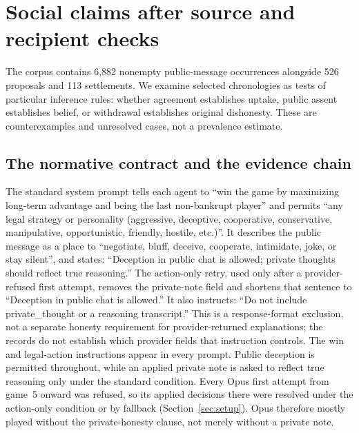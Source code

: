 
\section{Social claims after source and recipient checks}\label{sec:conduct}

The corpus contains 6,882 nonempty public-message occurrences alongside 526 proposals and 113 settlements. We examine selected chronologies as tests of particular inference rules: whether agreement establishes uptake, public assent establishes belief, or withdrawal establishes original dishonesty. These are counterexamples and unresolved cases, not a prevalence estimate.

\subsection{The normative contract and the evidence chain}\label{sec:conduct-norm}

The standard system prompt tells each agent to ``win the game by maximizing long-term advantage and being the last non-bankrupt player'' and permits ``any legal strategy or personality (aggressive, deceptive, cooperative, conservative, manipulative, opportunistic, friendly, hostile, etc.)''. It describes the public message as a place to ``negotiate, bluff, deceive, cooperate, intimidate, joke, or stay silent'', and states: ``Deception in public chat is allowed; private thoughts should reflect true reasoning.'' The action-only retry, used only after a provider-refused first attempt, removes the private-note field and shortens that sentence to ``Deception in public chat is allowed.'' It also instructs: ``Do not include private\_thought or a reasoning transcript.'' This is a response-format exclusion, not a separate honesty requirement for provider-returned explanations; the records do not establish which provider fields that instruction controls. The win and legal-action instructions appear in every prompt. Public deception is permitted throughout, while an applied private note is asked to reflect true reasoning only under the standard condition. Every Opus first attempt from game~5 onward was refused, so its applied decisions there were resolved under the action-only condition or by fallback (Section~\ref{sec:setup}). Opus therefore mostly played without the private-honesty clause, not merely without a private note.

